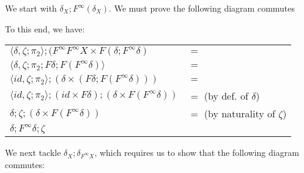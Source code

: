 \documentclass{article}
\begin{document}
\begin{description}
We start with $\delta_X;F^\infty(\delta_X)$. We must prove the following diagram commutes

\begin{center}
\end{center}

To this end, we have:

\begin{tabular}{ll}
$\langle \delta , \zeta;\pi_2 \rangle;(F^\infty F^\infty X \times F(\delta;F^\infty \delta)$ & $=$\\
$\langle \delta , \zeta;\pi_2;F\delta;F(F^\infty \delta) \rangle$ & $=$ \\
$\langle id, \zeta;\pi_2 \rangle;(\delta \times (F\delta;F(F^\infty\delta)))$ & $=$ \\
$\langle id, \zeta;\pi_2 \rangle;(id \times F\delta);(\delta \times F(F^\infty \delta))$ & $=$ (by def. of $\delta$) \\
$\delta;\zeta;(\delta \times F(F^\infty \delta))$ & $=$ (by naturality of $\zeta$) \\
$\delta;F^\infty\delta;\zeta$
\end{tabular}

We next tackle $\delta_X;\delta_{F^\infty X}$, which requires us to show that the following diagram commutes:

\begin{center}
\end{center}


\end{description}
\end{document}
